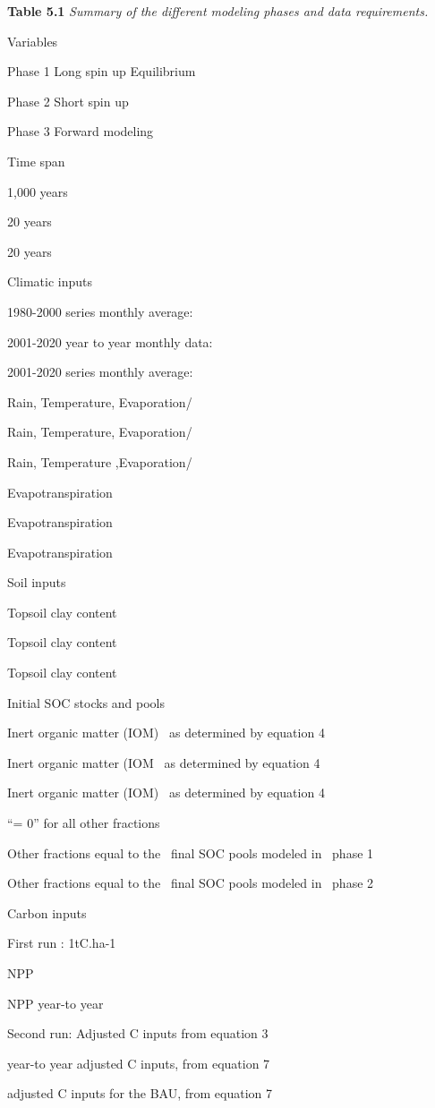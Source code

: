 \documentclass[
  10pt,
  b5paper,
]{book}
\begin{document}
\textbf{Table 5.1} \emph{Summary of the different modeling phases and data requirements.}

Variables

Phase 1 Long spin up Equilibrium

Phase 2 Short spin up

Phase 3 Forward modeling

Time span

1,000 years

20 years

20 years

Climatic inputs

1980-2000 series monthly average:

2001-2020 year to year monthly data:

2001-2020 series monthly average:

Rain, Temperature, Evaporation/

Rain, Temperature, Evaporation/

Rain, Temperature ,Evaporation/

Evapotranspiration

Evapotranspiration

Evapotranspiration

Soil inputs

Topsoil clay content

Topsoil clay content

Topsoil clay content

Initial SOC stocks and pools

Inert organic matter (IOM)~ as determined by equation 4

Inert organic matter (IOM~ as determined by equation 4

Inert organic matter (IOM)~ as determined by equation 4

``= 0'' for all other fractions

Other fractions equal to the~ final SOC pools modeled in~ phase 1

Other fractions equal to the~ final SOC pools modeled in~ phase 2

Carbon inputs

First run : 1tC.ha-1

NPP

NPP year-to year

Second run: Adjusted C inputs from equation 3

year-to year adjusted C inputs, from equation 7

adjusted C inputs for the BAU, from equation 7
\end{document}
